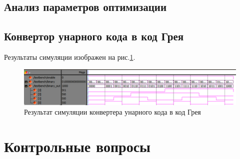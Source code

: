 \documentclass[a4paper,14pt]{article}
\begin{document}
\subsection{Анализ параметров оптимизации}

\subsection{Конвертор унарного кода в код Грея}


Результаты симуляции изображен на рис.\ref{fig:gray_sim}.
\begin{figure}[H]
	\centering
	\includegraphics[width=0.9\linewidth]{imgs/gray_sim}
	\caption{Результат симуляции конвертера унарного кода в код Грея}
	\label{fig:gray_sim}
\end{figure}
 
\section{Контрольные вопросы}
\end{document}
